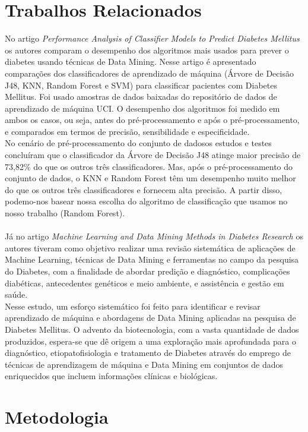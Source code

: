 \documentclass[12pt]{article}
\begin{document}
\section{Trabalhos Relacionados}
No artigo \textit{Performance Analysis of Classifier Models to Predict Diabetes Mellitus} \cite{KANDHASAMY201545} os autores comparam o desempenho dos algoritmos mais usados para prever o diabetes usando técnicas de Data Mining. Nesse artigo é apresentado comparações dos classificadores de aprendizado de máquina (Árvore de Decisão J48, KNN, Random Forest e SVM) para classificar pacientes com Diabetes Mellitus. Foi usado amostras de dados baixadas do repositório de dados de aprendizado de máquina UCI. O desempenho dos algoritmos foi medido em ambos os casos, ou seja, antes do pré-processamento e após o pré-processamento, e comparados em termos de precisão, sensibilidade e especificidade.\\
No cenário de pré-processamento do conjunto de dadosos estudos e testes concluíram que o classificador da Árvore de Decisão J48 atinge maior precisão de 73,82\% do que os outros três classificadores. Mas, após o pré-processamento do conjunto de dados, o KNN e Random Forest têm um desempenho muito melhor do que os outros três classificadores e fornecem alta precisão. A partir disso, podemo-nos basear nossa escolha do algoritmo de classificação que usamos no nosso trabalho (Random Forest).\\\\
Já no artigo \textit{Machine Learning and Data Mining Methods in Diabetes Research} \cite{KAVAKIOTIS2017104} os autores tiveram como objetivo realizar uma revisão sistemática de aplicações de Machine Learning, técnicas de Data Mining e ferramentas no campo da pesquisa do Diabetes, com a finalidade de abordar predição e diagnóstico, complicações diabéticas, antecedentes genéticos e meio ambiente, e assistência e gestão em saúde.\\
Nesse estudo, um esforço sistemático foi feito para identificar e revisar aprendizado de máquina e abordagens de Data Mining aplicadas na pesquisa de Diabetes Mellitus. O advento da biotecnologia, com a vasta quantidade de dados produzidos, espera-se que dê origem a uma exploração mais aprofundada para o diagnóstico, etiopatofisiologia e tratamento de Diabetes através do emprego de técnicas de aprendizagem de máquina e Data Mining em conjuntos de dados enriquecidos que incluem informações clínicas e biológicas.

\section{Metodologia}
\end{document}
